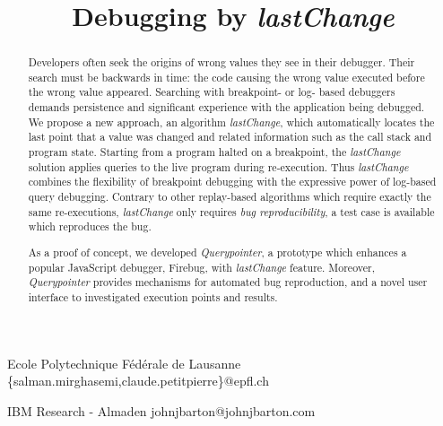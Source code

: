 \documentclass[preprint]{sigplanconf}
\begin{document}
\copyrightdata{[to be supplied]} 

\preprintfooter{}   %

\title{Debugging by \textit{lastChange}}
\subtitle{}

           {Ecole Polytechnique F\'ed\'erale de Lausanne}
           {\{salman.mirghasemi,claude.petitpierre\}@epfl.ch}

           {IBM Research - Almaden}
           {johnjbarton@johnjbarton.com}

\maketitle

\begin{abstract}

Developers often seek the origins of wrong values they see in their
debugger. Their search must be backwards in time: the code causing the
wrong value executed before the wrong value appeared. Searching with
breakpoint- or log- based debuggers demands persistence and
significant experience with the application being debugged. We propose
a new approach, an algorithm \textit{lastChange}, which automatically
locates the last point that a value was changed and related
information such as the call stack and program state. Starting from a
program halted on a breakpoint, the \textit{lastChange} solution
applies queries to the live program during re-execution. Thus
\textit{lastChange} combines the flexibility of breakpoint debugging
with the expressive power of log-based query debugging.  Contrary to
other replay-based algorithms which require exactly the same
re-executions, \textit{lastChange} only requires \textit{bug
  reproducibility}, a test case is available which reproduces the bug.

As a proof of concept, we developed \textit{Querypointer}, a prototype
which enhances a popular JavaScript debugger, Firebug, with
\textit{lastChange} feature. Moreover, \textit{Querypointer} provides
mechanisms for automated bug reproduction, and a novel user interface
to investigated execution points and results.

\end{abstract}

\end{document}
